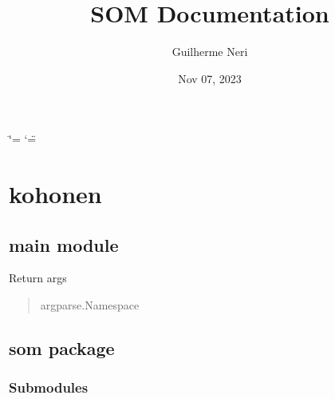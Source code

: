 \documentclass[letterpaper,10pt,english]{sphinxmanual}
\title{SOM Documentation}
\date{Nov 07, 2023}
\author{Guilherme Neri}
\begin{document}
\ifdefined\shorthandoff
  \ifnum\catcode`\=\string=\active\shorthandoff{=}\fi
  \ifnum\catcode`\"=\active{}\fi
\fi

\pagestyle{empty}
\sphinxmaketitle
\pagestyle{plain}
\sphinxtableofcontents
\pagestyle{normal}
\label{\detokenize{index::doc}}


\sphinxstepscope


\chapter{kohonen}
\label{\detokenize{modules:kohonen}}\label{\detokenize{modules::doc}}
\sphinxstepscope


\section{main module}
\label{\detokenize{main:module-main}}\label{\detokenize{main:main-module}}\label{\detokenize{main::doc}}
\sphinxAtStartPar
{}

\begin{fulllineitems}
\label{\detokenize{main:main.args}}
\pysigstartsignatures
{}
\pysigstopsignatures
\sphinxAtStartPar
Return args
\begin{quote}\begin{description}
\sphinxAtStartPar
argparse.Namespace

\end{description}\end{quote}

\end{fulllineitems}


\sphinxstepscope


\section{som package}
\label{\detokenize{som:som-package}}\label{\detokenize{som::doc}}

\subsection{Submodules}
\label{\detokenize{som:submodules}}
\end{document}
